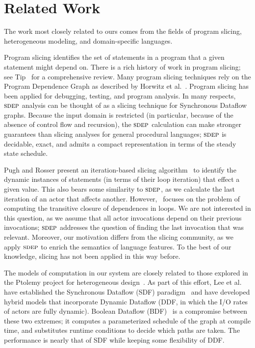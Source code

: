 \section{Related Work}
\label{sec:related-work}

The work most closely related to ours comes from the fields of program
slicing, heterogeneous modeling, and domain-specific languages.

Program slicing identifies the set of statements in a program that a
given statement might depend on.  There is a rich history of work in
program slicing; see Tip~\cite{tip95slice} for a comprehensive review.
Many program slicing techniques rely on the Program Dependence Graph
as described by Horwitz et al.~\cite{hrb88pdg}.  Program slicing has
been applied for debugging, testing, and program analysis.  In many
respects, $\textsc{sdep}$ analysis can be thought of as a slicing technique
for Synchronous Dataflow graphs.  Because the input domain is
restricted (in particular, because of the absence of control flow and
recursion), the $\textsc{sdep}$ calculation can make stronger guarantees than
slicing analyses for general procedural languages; $\textsc{sdep}$ is
decidable, exact, and admits a compact representation in terms of the
steady state schedule.

Pugh and Rosser present an iteration-based slicing algorithm~\cite{pugh97slice}
to identify the dynamic instances of statements (in terms of
their loop iteration) that effect a given value.  This also bears
some similarity to $\textsc{sdep}$, as we calculate the last iteration of an
actor that affects another.  However,~\cite{pugh97slice} focuses on the
problem of computing the transitive closure of dependences in loops.
We are not interested in this question, as we assume that all actor
invocations depend on their previous invocations; $\textsc{sdep}$ addresses
the question of finding the last invocation that was relevant.
Moreover, our motivation differs from the slicing community, as we
apply $\textsc{sdep}$ to enrich the semantics of language features.  To the
best of our knowledge, slicing has not been applied in this way
before.

The models of computation in our system are closely related to those
explored in the Ptolemy project for heterogeneous
design~\cite{ptolemy03overview}.  As part of this effort, Lee et
al. have established the Synchronous Dataflow (SDF)
paradigm~\cite{LM87-i} and have developed hybrid models that
incorporate Dynamic Dataflow (DDF, in which the I/O rates of actors
are fully dynamic).  Boolean Dataflow (BDF)~\cite{ha97profile} is a
compromise between these two extremes; it computes a parameterized
schedule of the graph at compile time, and substitutes runtime
conditions to decide which paths are taken.  The performance is nearly
that of SDF while keeping some flexibility of DDF.  

